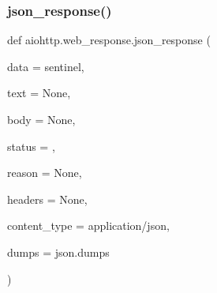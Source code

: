 \subsubsection{\texorpdfstring{json\+\_\+response()}{json\_response()}}
{\footnotesize\ttfamily def aiohttp.\+web\+\_\+response.\+json\+\_\+response (\begin{DoxyParamCaption}\item[{}]{data = {\ttfamily sentinel},  }\item[{}]{text = {\ttfamily None},  }\item[{}]{body = {\ttfamily None},  }\item[{}]{status = {},  }\item[{}]{reason = {\ttfamily None},  }\item[{}]{headers = {\ttfamily None},  }\item[{}]{content\+\_\+type = {\ttfamily \textquotesingle{}application/json\textquotesingle{}},  }\item[{}]{dumps = {\ttfamily json.dumps} }\end{DoxyParamCaption})}

